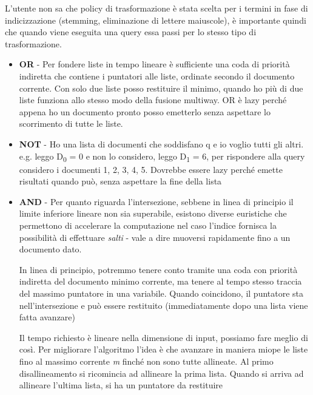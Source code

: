 \documentclass[12pt,italian]{report}
\begin{document}
L'utente non sa che policy di trasformazione è stata scelta per i termini in fase di indicizzazione (stemming, eliminazione di lettere maiuscole), è importante quindi che quando viene eseguita una query essa passi per lo stesso tipo di trasformazione.

\begin{itemize}
    \item \textbf{OR} - Per fondere liste in tempo lineare è sufficiente una coda di priorità indiretta che contiene i puntatori alle liste, ordinate secondo il documento corrente. Con solo due liste posso restituire il minimo, quando ho più di due liste funziona allo stesso modo della fusione multiway. OR è lazy perché appena ho un documento pronto posso emetterlo senza aspettare lo scorrimento di tutte le liste.
        
    \item \textbf{NOT} - Ho una lista di documenti che soddisfano q e io voglio tutti gli altri. 
    e.g. leggo D\textsubscript{0} = 0 e non lo considero, leggo D\textsubscript{1} = 6, per rispondere alla query considero i documenti 1, 2, 3, 4, 5. Dovrebbe essere lazy perché emette risultati quando può, senza aspettare la fine della lista
    
    \item \textbf{AND} - Per quanto riguarda l'intersezione, sebbene in linea di principio il limite inferiore lineare non sia superabile, esistono diverse euristiche che permettono di accelerare la computazione nel caso l'indice fornisca la possibilità di effettuare \textit{salti} - vale a dire muoversi rapidamente fino a un documento dato. 
    
    In linea di principio, potremmo tenere conto tramite una coda con priorità indiretta del documento minimo corrente, ma tenere al tempo stesso traccia del massimo puntatore in una variabile. Quando coincidono, il puntatore sta nell'intersezione e può essere restituito (immediatamente dopo una lista viene fatta avanzare)
    \vspace{50mm}
    
    Il tempo richiesto è lineare nella dimensione di input, possiamo fare meglio di così. Per migliorare l'algoritmo l'idea è che avanzare in maniera miope le liste fino al massimo corrente \textit{m} finché non sono tutte allineate. Al primo disallineamento  si ricomincia ad allineare la prima lista. Quando si arriva ad allineare l'ultima lista, si ha un puntatore da restituire
    \vspace{50mm}
    

\end{itemize}
\end{document}
